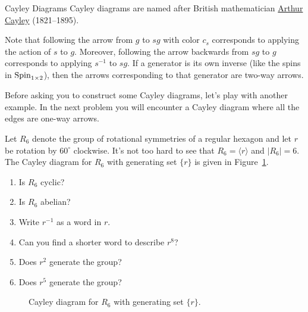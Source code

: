 \begin{section}{Cayley Diagrams}
Cayley diagrams are named after British mathematician \href{https://en.wikipedia.org/wiki/Arthur_Cayley}{Arthur Cayley} (1821--1895).

Note that following the arrow from $g$ to $sg$ with color $c_s$ corresponds to applying the action of $s$ to $g$. Moreover, following the arrow backwards from $sg$ to $g$ corresponds to applying $s^{-1}$ to $sg$. If a generator is its own inverse (like the spins in $\operatorname{Spin}_{1\times 2}$), then the arrows corresponding to that generator are two-way arrows.   

Before asking you to construct some Cayley diagrams, let's play with another example. In the next problem you will encounter a Cayley diagram where all the edges are one-way arrows.

\begin{problem}\label{prob:introducing_R6}
Let $R_6$ denote the group of rotational symmetries of a regular hexagon and let $r$ be rotation by $60^{\circ}$ clockwise. It's not too hard to see that $R_6=\langle r\rangle$ and $|R_6|=6$.  The Cayley diagram for $R_6$ with generating set $\{r\}$ is given in Figure~\ref{fig:rotation6}. 
\begin{enumerate}[label=\textrm{(\alph*)}]
\item Is $R_6$ cyclic?
\item Is $R_6$ abelian?
\item Write $r^{-1}$ as a word in $r$.
\item Can you find a shorter word to describe $r^8$?
\item Does $r^2$ generate the group?
\item Does $r^5$ generate the group?
\end{enumerate}
\end{problem}

\begin{figure}[!ht]
\centering
{}
\caption{Cayley diagram for $R_6$ with generating set $\{r\}$.}
\label{fig:rotation6}
\end{figure}
 

\end{section}
